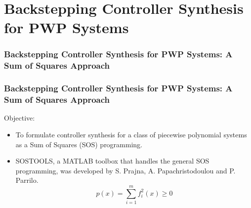 \documentclass{beamer}
\newcommand{\green}{\color[rgb]{0,0.79,0}}
\newcommand{\beq}{\begin{equation*}}
\newcommand{\eeq}{\end{equation*}}
\begin{document}
\section[Chapter 5]{Backstepping Controller Synthesis for PWP Systems}

  \frame
  {
    \frametitle{Backstepping Controller Synthesis for PWP Systems: A Sum of Squares Approach}
    \centerline{}
  }

  \frame
  {
    \frametitle{Backstepping Controller Synthesis for PWP Systems: A Sum of Squares Approach}
    
    Objective:
    \begin{itemize}
    \item<1-> To formulate controller synthesis for a class of piecewise polynomial systems as a {\green Sum of Squares (SOS)} programming.
\item<2-> SOSTOOLS, a MATLAB toolbox that handles the general SOS programming, was developed by S. Prajna, A. Papachristodoulou and P. Parrilo. 
    \beq
		p(x) = \sum_{i=1}^m f_i^2(x) \geq 0
		\eeq
\end{itemize}
}
\end{document}
